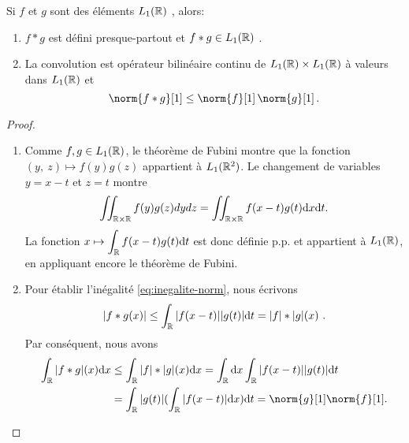 \begin{proposition}
\label{prop:20-2-1}
Si $f$ et $g$ sont des \'el\'ements $L_1(\mathbb{R})$ , alors:
\begin{enumerate}[label=(\roman*)]
\item $f*g$ est d\'efini presque-partout et $f*g \in L_1(\mathbb{R})$ .
\item La convolution est op\'erateur bilin\'eaire continu de $L_1(\mathbb{R})\times L_1(\mathbb{R})$ \`a valeurs dans $L_1(\mathbb{R})$ et
\begin{equation}
\label{eq:inegalite-norm}
\norm{f*g}[1] \leq \norm{f}[1] \, \norm{ g}[1] \, .
\end{equation}
\end{enumerate}
\end{proposition}
\begin{proof}
 \begin{enumerate}[label=(\roman*), wide=0pt, labelindent=\parindent]
\item Comme $f, g \in L_1(\mathbb{R})$, le th\'eor\`eme de Fubini montre que la fonction $(y,\ z)\mapsto f(y)g(z)$ appartient \`a $L_{1}(\mathbb{R}^{2})$. Le changement de variables $y=x-t$ et $z=t$ montre
$$
\iint_{\mathbb{R}\times \mathbb{R}}f(y)g(z)dydz=\iint_{\mathbb{R}\times \mathbb{R}}f(x-t)g(t)\mathrm{d} x\mathrm{d} t.
$$
La fonction $x\displaystyle \mapsto\int_{\mathbb{R}}f(x-t)g(t)\mathrm{d} t$ est donc d\'efinie p.p. et appartient \`a  $L_1(\mathbb{R})$, en appliquant encore le th\'eor\`eme de Fubini.
\item Pour \'etablir l'in\'egalit\'e \eqref{eq:inegalite-norm}, nous \'ecrivons
$$
|f*g(x)|\leq\int_{\mathbb{R}}|f(x-t)||g(t)|\mathrm{d} t=|f|*|g|(x)\ .
$$
Par cons\'equent, nous avons
\begin{align*}
\int_{\rset}|f*g|(x)\rmd x
&\leq\int_{\rset}|f|*|g|(x)\rmd x=\int_{\rset}\rmd x\int_{\rset}|f(x-t)||g(t)|\rmd t \\
&=\int_{\rset}|g(t)|(\int_{\rset}|f(x-t)|\rmd x)\rmd t= \norm{g}[1] \norm{f}[1].
\end{align*}
\end{enumerate}
\end{proof}

